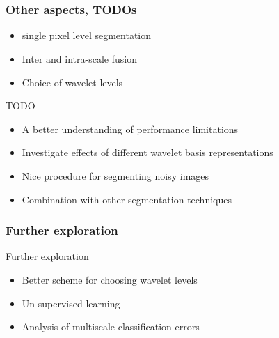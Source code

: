 \documentclass[12pt]{beamer}
\begin{document}
\section*{}
\begin{frame}
  \frametitle{Other aspects, TODOs }
  
  \begin{example}
    \begin{itemize}
    \item single pixel level segmentation
    \item Inter and intra-scale fusion
    \item Choice of wavelet levels
  \end{itemize}
  \end{example}

  \begin{block}{TODO}
  \begin{itemize}
    \item A better understanding of performance limitations
    \item Investigate effects of different wavelet basis representations
    \item Nice procedure for segmenting noisy images
    \item Combination with other segmentation techniques
  \end{itemize}
  \end{block}
\end{frame}

\begin{frame}
  \frametitle{Further exploration }
  \begin{block}{Further exploration}
  \begin{itemize}
    \item Better scheme for choosing wavelet levels
    \item Un-supervised learning
    \item Analysis of multiscale classification errors
  \end{itemize}
  \end{block}
\end{frame}

\end{document}
